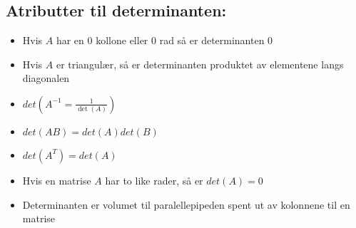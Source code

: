 \documentclass[12pt,a4paper,twocolumn,twoside]{article}
\begin{document}
\subsection*{Atributter til determinanten:}
\begin{itemize}[topsep=0pt,itemsep=0pt, partopsep=0pt]
    \item Hvis $A$ har en 0 kollone eller 0 rad så er determinanten 0
    \item Hvis $A$ er triangulær, så er determinanten produktet av elementene langs diagonalen
    \item $det(A^{-1}=\frac{1}{\det(A)})$
    \item $det(AB) = det(A)det(B)$
    \item $det(A^T)=det(A)$
    \item Hvis en matrise $A$ har to like rader, så er $det(A)=0$
    \item Determinanten er volumet til paralellepipeden spent ut av kolonnene til en matrise
\end{itemize}
\end{document}
